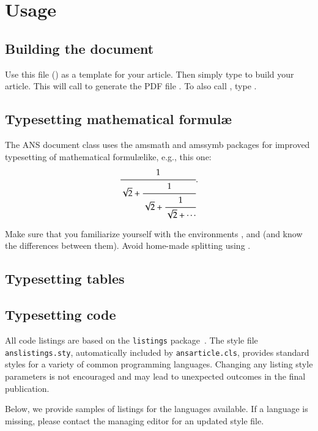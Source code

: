 \documentclass{ansarticle}
\begin{document}
\section{Usage}

\subsection{Building the document}

Use this file () as a template for your article. Then
simply type  to build your article. This will call
 to generate the PDF file . To also call
, type .

\subsection{Typesetting mathematical formul\ae}

The ANS document class uses the amsmath and amssymb packages for
improved typesetting of mathematical formul\ae like, e.g., this one:
\begin{equation}
  \cfrac{1}{\sqrt{2}+
    \cfrac{1}{\sqrt{2}+
      \cfrac{1}{\sqrt{2}+\dotsb
  }}}.
\end{equation}

Make sure that you familiarize yourself with the 
environments ,  and  (and know the
differences between them). Avoid home-made splitting using
.

\subsection{Typesetting tables}


\subsection{Typesetting code}

All code listings are based on the \texttt{listings}
package~\cite{HeinzMoses07}. The style file \texttt{anslistings.sty},
automatically included by \texttt{ansarticle.cls}, provides standard
styles for a variety of common programming languages. Changing any
listing style parameters is not encouraged and may lead to unexpected
outcomes in the final publication.

Below, we provide samples of listings for the languages available. If
a language is missing, please contact the managing editor for an
updated style file.
\end{document}
